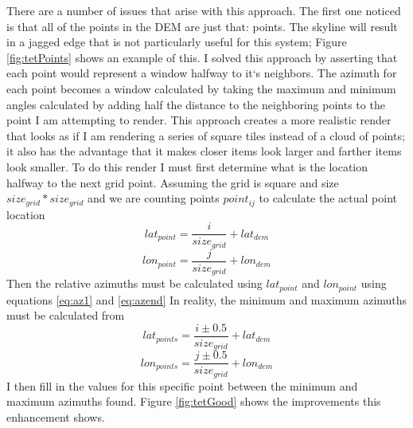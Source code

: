 \documentclass{acm_proc_article-sp}
\begin{document}
There are a number of issues that arise with this approach.  The first one noticed is that all of the points in the DEM are just that: points.  The skyline will result in a jagged edge that is not particularly useful for this system; Figure \ref{fig:tetPoints} shows an example of this.  I solved this approach by asserting that each point would represent a window halfway to it`s neighbors.  The azimuth for each point becomes a window calculated by taking the maximum and minimum angles calculated by adding half the distance to the neighboring points to the point I am attempting to render.  This approach creates a more realistic render that looks as if I am rendering a series of square tiles instead of a cloud of points; it also has the advantage that it makes closer items look larger and farther items look smaller. To do this render I must first determine what is the location halfway to the next grid point.  Assuming the grid is square and size $size_{grid} * size_{grid}$ and we are counting points $point_{ij}$  to calculate the actual point location
\begin{equation}
	lat_{point} = \frac{i}{size_{grid}}+lat_{dem}
\end{equation}
\begin{equation}
	lon_{point} = \frac{j}{size_{grid}}+lon_{dem}
\end{equation}
Then the relative azimuths must be calculated using $lat_{point}$ and $lon_{point}$ using equations \ref{eq:az1} and \ref{eq:azend}
In reality, the minimum and maximum azimuths must be calculated from
\begin{equation}
	lat_{points} = \frac{i\pm0.5}{size_{grid}}+lat_{dem}
\end{equation}
\begin{equation}
	lon_{points} = \frac{j\pm0.5}{size_{grid}}+lon_{dem}
\end{equation}
  I then fill in the values for this specific point between the minimum and maximum azimuths found. Figure \ref{fig:tetGood} shows the improvements this enhancement shows.
\end{document}
